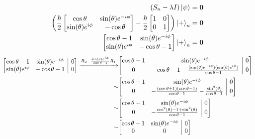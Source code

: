 \documentclass[11pt]{article}
\makeatletter
\newenvironment{amatrix}[1]{%
    \left[\begin{array}{@{}*{#1}{c}|c@{}}
}{%
    \end{array}\right]
}
\makeatother
\begin{document}
\begin{enumerate}[label=\textbf{\arabic*.}, start=2]
{\begin{enumerate}[label=\textbf{(\alph*)}]
{                    \begin{align*}
                        (S_n-\lambda I)\ket{\psi}&=\mathbf{0} \\
                        \left(\frac \hbar 2 \begin{bmatrix}\cos\theta & \sin(\theta)e^{-i\phi} \\ \sin(\theta)e^{i\phi} & -\cos\theta\end{bmatrix}-\frac \hbar 2 \begin{bmatrix}1 & 0 \\ 0 & 1\end{bmatrix}\right)\ket{+}_n&=\mathbf{0} \\
                        \begin{bmatrix}\cos\theta-1 & \sin(\theta)e^{-i\phi} \\ \sin(\theta)e^{i\phi} & -\cos\theta-1\end{bmatrix}\ket{+}_n&=\mathbf{0}
                    \end{align*}
                    \begin{align*}
                        \begin{amatrix}{2}\cos\theta-1 & \sin(\theta)e^{-i\phi} & 0 \\ \sin(\theta)e^{i\phi} & -\cos\theta-1 & 0\end{amatrix}
                        \xrightarrow{R_2-\frac{\sin(\theta)e^{i\phi}}{\cos\theta-1}R_1}
                        &\begin{amatrix}{2}\cos\theta-1 & \sin(\theta)e^{-i\phi} & 0 \\ 0 & -\cos\theta-1-\frac{(\sin(\theta)e^{-i\phi})(\sin(\theta)e^{i\phi})}{\cos\theta-1} & 0\end{amatrix} \\
                        \sim
                        &\begin{amatrix}{2}\cos\theta-1 & \sin(\theta)e^{-i\phi} & 0 \\ 0 & -\frac{(\cos\theta+1)(\cos\theta-1)}{\cos\theta-1}-\frac{\sin^2(\theta)}{\cos\theta-1} & 0\end{amatrix} \\
                        \sim
                        &\begin{amatrix}{2}\cos\theta-1 & \sin(\theta)e^{-i\phi} & 0 \\ 0 & -\frac{\cos^2(\theta)-1+\sin^2(\theta)}{\cos\theta-1} & 0\end{amatrix} \\
                        \sim
                        &\begin{amatrix}{2}\cos\theta-1 & \sin(\theta)e^{-i\phi} & 0 \\ 0 & 0 & 0\end{amatrix}

\end{align*}}
\end{enumerate}}
\end{enumerate}
\end{document}
